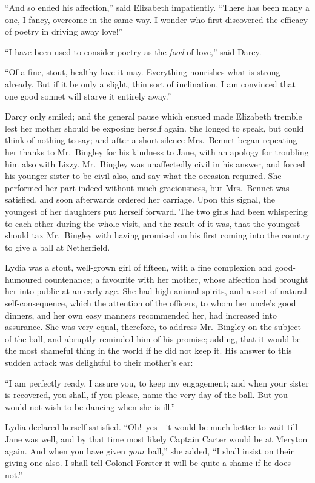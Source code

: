 \documentclass[12pt,english,oneside]{book}
\begin{document}
{}``And so ended his affection,'' said Elizabeth impatiently. {}``There
has been many a one, I fancy, overcome in the same way. I wonder who
first discovered the efficacy of poetry in driving away love!''\ 

{}``I have been used to consider poetry as the \textit{food} of love,''
said Darcy.

{}``Of a fine, stout, healthy love it may. Everything nourishes what
is strong already. But if it be only a slight, thin sort of inclination,
I am convinced that one good sonnet will starve it entirely away.''

Darcy only smiled; and the general pause which ensued made Elizabeth
tremble lest her mother should be exposing herself again. She longed
to speak, but could think of nothing to say; and after a short silence
Mrs.\ Bennet began repeating her thanks to Mr.\ Bingley for his
kindness to Jane, with an apology for troubling him also with Lizzy.
Mr.\ Bingley was unaffectedly civil in his answer, and forced his
younger sister to be civil also, and say what the occasion required.
She performed her part indeed without much graciousness, but Mrs.\ Bennet
was satisfied, and soon afterwards ordered her carriage. Upon this
signal, the youngest of her daughters put herself forward. The two
girls had been whispering to each other during the whole visit, and
the result of it was, that the youngest should tax Mr.\ Bingley with
having promised on his first coming into the country to give a ball
at Netherfield.

Lydia was a stout, well-grown girl of fifteen, with a fine complexion
and good-humoured countenance; a favourite with her mother, whose
affection had brought her into public at an early age. She had high
animal spirits, and a sort of natural self-consequence, which the
attention of the officers, to whom her uncle's good dinners, and her
own easy manners recommended her, had increased into assurance. She
was very equal, therefore, to address Mr.\ Bingley on the subject
of the ball, and abruptly reminded him of his promise; adding, that
it would be the most shameful thing in the world if he did not keep
it. His answer to this sudden attack was delightful to their mother's
ear:

{}``I am perfectly ready, I assure you, to keep my engagement; and
when your sister is recovered, you shall, if you please, name the
very day of the ball. But you would not wish to be dancing when she
is ill.''

Lydia declared herself satisfied. {}``Oh!\ yes\mbox{---}it would
be much better to wait till Jane was well, and by that time most likely
Captain Carter would be at Meryton again. And when you have given
\textit{your} ball,'' she added, {}``I shall insist on their giving
one also. I shall tell Colonel Forster it will be quite a shame if
he does not.''
\end{document}

